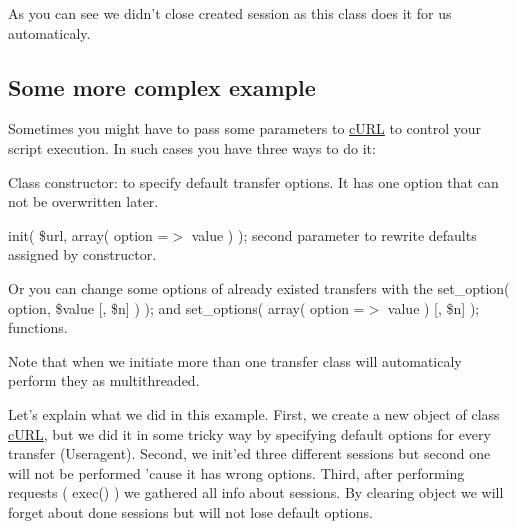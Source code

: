 As you can see we didn't close created session as this class does it for us automaticaly. \hypertarget{index_complex_example}{}\subsection{Some more complex example}\label{index_complex_example}
Sometimes you might have to pass some parameters to \hyperlink{a00002}{cURL} to control your script execution. In such cases you have three ways to do it:
\begin{DoxyItemize}
\item Class constructor: to specify default transfer options. It has one option that can not be overwritten later.
\item {\ttfamily init( \$url, array( option =$>$ value ) );} second parameter to rewrite defaults assigned by constructor.
\item Or you can change some options of already existed transfers with the {\ttfamily set\_\-option( option, \$value \mbox{[}, \$n\mbox{]} ) );} and {\ttfamily set\_\-options( array( option =$>$ value ) \mbox{[}, \$n\mbox{]} );} functions.
\end{DoxyItemize}


 Note that when we initiate more than one transfer class will automaticaly perform they as multithreaded.

Let's explain what we did in this example. First, we create a new object of class \hyperlink{a00002}{cURL}, but we did it in some tricky way by specifying default options for every transfer (Useragent). Second, we init'ed three different sessions but second one will not be performed 'cause it has wrong options. Third, after performing requests ( {\ttfamily exec()} ) we gathered all info about sessions. By clearing object we will forget about done sessions but will not lose default options.

